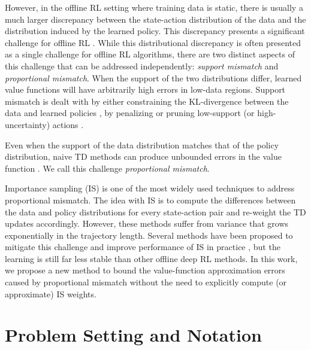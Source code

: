 However, in the offline RL setting where training data is static, there is usually a much larger discrepancy between the state-action distribution of the data and the distribution induced by the learned policy.
This discrepancy presents a significant challenge for offline RL \citep{levine2020survey}.
While this distributional discrepancy is often presented as a single challenge for offline RL algorithms, there are two distinct aspects of this challenge that can be addressed independently: \textit{support mismatch} and \textit{proportional mismatch}.
When the support of the two distributions differ, learned value functions will have arbitrarily high errors in low-data regions.
Support mismatch is dealt with by either constraining the KL-divergence between the data and learned policies \citep{fujimoto2019off, kumar2019stabilizing, wu2019behavior}, by penalizing or pruning low-support (or high-uncertainty) actions \citep{kumar2020cql, yu2020mopo, kidambi2020morel}.

Even when the support of the data distribution matches that of the policy distribution, naive TD methods can produce unbounded errors in the value function \citep{tsitsiklis1996analysis}.
We call this challenge \textit{proportional mismatch}.

Importance sampling (IS) \citep{precup2000eligibility} is one of the most widely used techniques to address proportional mismatch.
The idea with IS is to compute the differences between the data and policy distributions for every state-action pair and re-weight the TD updates accordingly.
However, these methods suffer from variance that grows exponentially in the trajectory length.
Several methods have been proposed to mitigate this challenge and improve performance of IS in practice \citep{hallak2017consistent, gelada2019off, nachum2019dualdice, nachum2019algaedice, liu2018breaking}, but the learning is still far less stable than other offline deep RL methods.
In this work, we propose a new method to bound the value-function approximation errors caused by proportional mismatch without the need to explicitly compute (or approximate) IS weights.



\section{Problem Setting and Notation }

